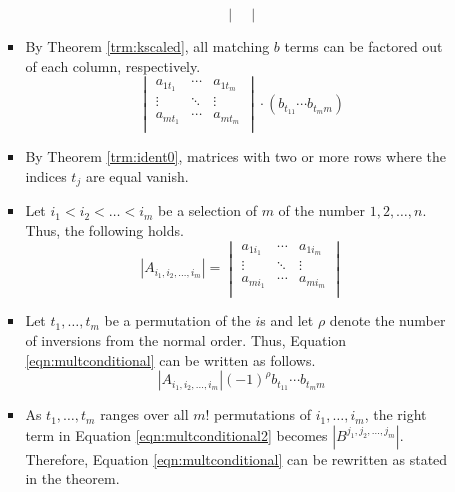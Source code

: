 \documentclass[titlepage]{article}
\newcounter{theorem}
\numberwithin{figure}{section}
\numberwithin{equation}{section}
\numberwithin{theorem}{section}
\begin{document}
\begin{itemize}
\begin{itemize}
\begin{itemize}
\begin{equation*}
\begin{vmatrix}
                \end{vmatrix}
            \end{equation*}
            \item By Theorem \ref{trm:kscaled}, all matching $b$ terms can be factored out of each column, respectively.
            \begin{equation}\label{eqn:multconditional}
                \begin{vmatrix}
                    a_{1t_1} & \cdots & a_{1t_m}\\
                    \vdots & \ddots & \vdots\\
                    a_{mt_1} & \cdots & a_{mt_m}\\
                \end{vmatrix}
                \cdot
                \left( b_{t_11}\cdots b_{t_mm} \right)
            \end{equation}
            \item By Theorem \ref{trm:ident0}, matrices with two or more rows where the indices $t_j$ are equal vanish.
            \item Let $i_1<i_2<\dots<i_m$ be a selection of $m$ of the number $1,2,\dots,n$. Thus, the following holds.
            \begin{equation*}
                \left| A_{i_1,i_2,\dots,i_m} \right| =
                \begin{vmatrix}
                    a_{1i_1} & \cdots & a_{1i_m}\\
                    \vdots & \ddots & \vdots\\
                    a_{mi_1} & \cdots & a_{mi_m}\\
                \end{vmatrix}
            \end{equation*}
            \item Let $t_1,\dots,t_m$ be a permutation of the $i$s and let $\rho$ denote the number of inversions from the normal order. Thus, Equation \ref{eqn:multconditional} can be written as follows.
            \begin{equation}\label{eqn:multconditional2}
                \left| A_{i_1,i_2,\dots,i_m} \right|(-1)^\rho b_{t_11}\cdots b_{t_mm}
            \end{equation}
            \item As $t_1,\dots,t_m$ ranges over all $m!$ permutations of $i_1,\dots,i_m$, the right term in Equation \ref{eqn:multconditional2} becomes $\left| B^{j_1,j_2,\dots,j_m} \right|$. Therefore, Equation \ref{eqn:multconditional} can be rewritten as stated in the theorem.

\end{itemize}
\end{itemize}
\end{itemize}
\end{document}

